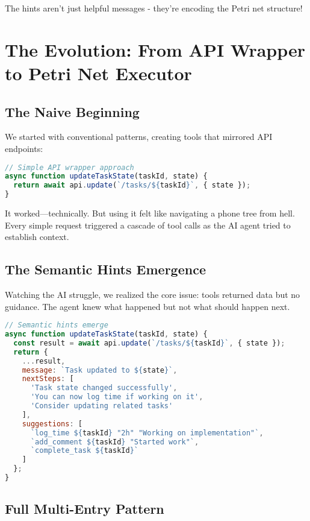 \documentclass[11pt,a4paper]{article}
\begin{document}
The hints aren't just helpful messages - they're encoding the Petri net structure!

\section{The Evolution: From API Wrapper to Petri Net Executor}

\subsection{The Naive Beginning}

We started with conventional patterns, creating tools that mirrored API endpoints:

\begin{lstlisting}[language=JavaScript]
// Simple API wrapper approach
async function updateTaskState(taskId, state) {
  return await api.update(`/tasks/${taskId}`, { state });
}
\end{lstlisting}

It worked—technically. But using it felt like navigating a phone tree from hell. Every simple request triggered a cascade of tool calls as the AI agent tried to establish context.

\subsection{The Semantic Hints Emergence}

Watching the AI struggle, we realized the core issue: tools returned data but no guidance. The agent knew what happened but not what should happen next.

\begin{lstlisting}[language=JavaScript]
// Semantic hints emerge
async function updateTaskState(taskId, state) {
  const result = await api.update(`/tasks/${taskId}`, { state });
  return {
    ...result,
    message: `Task updated to ${state}`,
    nextSteps: [
      'Task state changed successfully',
      'You can now log time if working on it',
      'Consider updating related tasks'
    ],
    suggestions: [
      `log_time ${taskId} "2h" "Working on implementation"`,
      `add_comment ${taskId} "Started work"`,
      `complete_task ${taskId}`
    ]
  };
}
\end{lstlisting}

\subsection{Full Multi-Entry Pattern}
\end{document}
